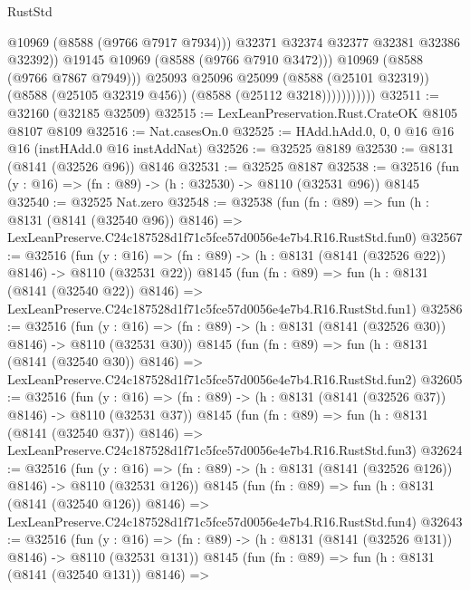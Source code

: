 \begin{lexlean}{RustStd}
\begin{coremodule}
                                @10969
                                (@8588 (@9766 @7917 @7934)))
                              @32371
                              @32374
                              @32377
                              @32381
                              @32386
                              @32392))
                          @19145
                          @10969
                          (@8588 (@9766 @7910 @3472)))
                        @10969
                        (@8588 (@9766 @7867 @7949)))
                      @25093
                      @25096
                      @25099
                      (@8588 (@25101 @32319))
                      (@8588 (@25105 @32319 @456))
                      (@8588 (@25112 @3218)))))))))))
@32511 := @32160 (@32185 @32509)
@32515 := LexLeanPreservation.Rust.CrateOK @8105 @8107 @8109
@32516 := Nat.casesOn.{0}
@32525 := HAdd.hAdd.{0, 0, 0} @16 @16 @16 (instHAdd.{0} @16 instAddNat)
@32526 := @32525 @8189
@32530 := @8131 (@8141 (@32526 @96)) @8146
@32531 := @32525 @8187
@32538 := @32516 (fun (y : @16) => (fn : @89) -> (h : @32530) -> @8110 (@32531 @96)) @8145
@32540 := @32525 Nat.zero
@32548 := @32538
    (fun (fn : @89) =>
    fun (h : @8131 (@8141 (@32540 @96)) @8146) =>
    LexLeanPreserve.C24c187528d1f71c5fce57d0056e4e7b4.R16.RustStd.fun0)
@32567 := @32516
    (fun (y : @16) => (fn : @89) -> (h : @8131 (@8141 (@32526 @22)) @8146) -> @8110 (@32531 @22))
    @8145
    (fun (fn : @89) =>
    fun (h : @8131 (@8141 (@32540 @22)) @8146) =>
    LexLeanPreserve.C24c187528d1f71c5fce57d0056e4e7b4.R16.RustStd.fun1)
@32586 := @32516
    (fun (y : @16) => (fn : @89) -> (h : @8131 (@8141 (@32526 @30)) @8146) -> @8110 (@32531 @30))
    @8145
    (fun (fn : @89) =>
    fun (h : @8131 (@8141 (@32540 @30)) @8146) =>
    LexLeanPreserve.C24c187528d1f71c5fce57d0056e4e7b4.R16.RustStd.fun2)
@32605 := @32516
    (fun (y : @16) => (fn : @89) -> (h : @8131 (@8141 (@32526 @37)) @8146) -> @8110 (@32531 @37))
    @8145
    (fun (fn : @89) =>
    fun (h : @8131 (@8141 (@32540 @37)) @8146) =>
    LexLeanPreserve.C24c187528d1f71c5fce57d0056e4e7b4.R16.RustStd.fun3)
@32624 := @32516
    (fun (y : @16) => (fn : @89) -> (h : @8131 (@8141 (@32526 @126)) @8146) -> @8110 (@32531 @126))
    @8145
    (fun (fn : @89) =>
    fun (h : @8131 (@8141 (@32540 @126)) @8146) =>
    LexLeanPreserve.C24c187528d1f71c5fce57d0056e4e7b4.R16.RustStd.fun4)
@32643 := @32516
    (fun (y : @16) => (fn : @89) -> (h : @8131 (@8141 (@32526 @131)) @8146) -> @8110 (@32531 @131))
    @8145
    (fun (fn : @89) =>
    fun (h : @8131 (@8141 (@32540 @131)) @8146) =>

\end{coremodule}
\end{lexlean}
